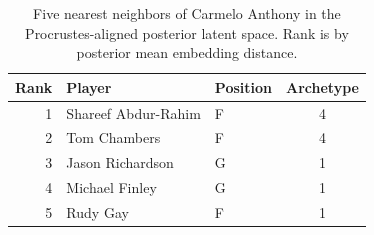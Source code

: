 \begin{table}[htbp]
  \centering\small
  \begin{tabular}{rllc}
    \toprule
    Rank & Player & Position & Archetype \\
    \midrule
    1 & Shareef Abdur-Rahim & F & 4 \\
    2 & Tom Chambers & F & 4 \\
    3 & Jason Richardson & G & 1 \\
    4 & Michael Finley & G & 1 \\
    5 & Rudy Gay & F & 1 \\
    \bottomrule
  \end{tabular}
  \caption{Five nearest neighbors of Carmelo Anthony in the Procrustes-aligned posterior latent space. Rank is by posterior mean embedding distance.}
  \label{tab:Carmelo_Anthony_neighbors}
\end{table}

